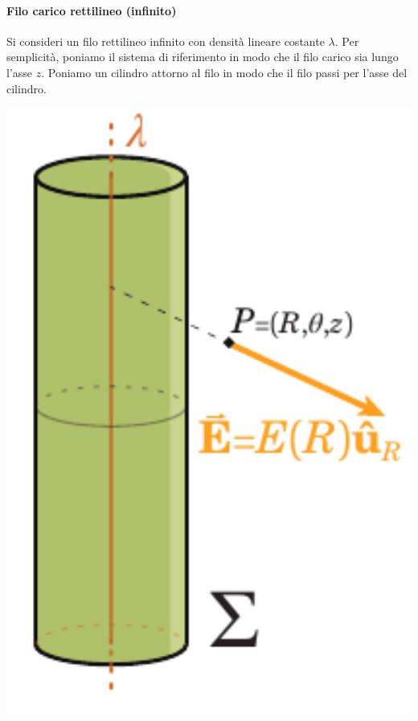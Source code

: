 \paragraph{Filo carico rettilineo (infinito)}
	Si consideri un filo rettilineo infinito con densità lineare costante $\lambda$. Per semplicità, poniamo il sistema di riferimento in modo che il filo carico sia lungo l'asse $z$. Poniamo un cilindro attorno al filo in modo che il filo passi per l'asse del cilindro.\\
	\begin{minipage}{0.29\textwidth}
		\begin{center}
			\includegraphics[width=1\textwidth]{images/chp2/chp2filoinfinito.pdf}
		\end{center}
	\end{minipage}\hspace{10pt}
